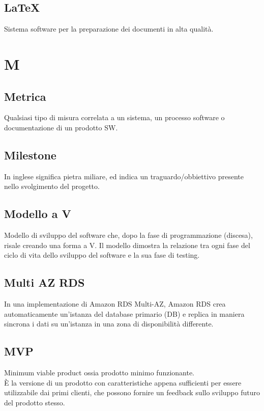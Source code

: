 \documentclass{classes/base}
\begin{document}
        \subsection*{LaTeX}
        Sistema software per la preparazione dei documenti in alta qualità.

    \newpage  
    \section{M} 
        \subsection*{Metrica}
        Qualsiasi tipo di misura correlata a un sistema, un processo software  o  documentazione  di  un  prodotto  SW. 

        \subsection*{Milestone}
        In inglese significa pietra miliare, ed indica un traguardo/obbiettivo presente nello svolgimento del progetto.
        
        \subsection*{Modello a V}
        Modello di sviluppo del software che, dopo la fase di programmazione (discesa), risale creando una forma a V. Il modello dimostra la relazione tra ogni fase del ciclo di vita dello sviluppo del software e la sua fase di testing.

        \subsection*{Multi AZ RDS} 
        In una implementazione di Amazon RDS Multi-AZ, Amazon RDS crea automaticamente un’istanza del database primario (DB) e replica in maniera sincrona i dati su un’istanza in una zona di disponibilità differente.

        \subsection*{MVP}
        Minimum viable product ossia prodotto minimo funzionante. \\
        È la versione di un prodotto con caratteristiche appena sufficienti per essere utilizzabile dai primi clienti, che possono fornire un feedback sullo sviluppo futuro del prodotto stesso.
\end{document}
